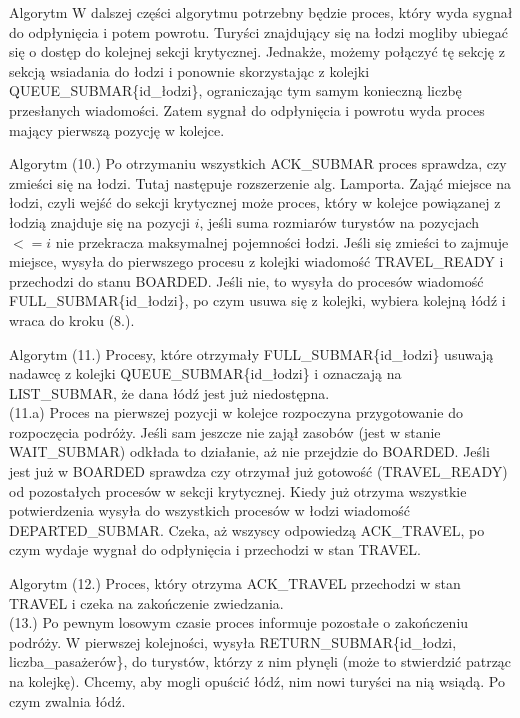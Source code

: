 \documentclass{beamer}
\begin{document}
\begin{frame}{Algorytm}
    \internallinenumbers
    W dalszej części algorytmu potrzebny będzie proces, który wyda sygnał do odpłynięcia i potem powrotu. Turyści znajdujący się na łodzi mogliby ubiegać się o dostęp do kolejnej sekcji krytycznej. Jednakże, możemy połączyć tę sekcję z sekcją wsiadania do łodzi i ponownie skorzystając z kolejki QUEUE\_SUBMAR\{id\_łodzi\}, ograniczając tym samym konieczną liczbę przesłanych wiadomości. Zatem sygnał do odpłynięcia i powrotu wyda proces mający pierwszą pozycję w kolejce.
\end{frame}

\begin{frame}{Algorytm}
    \internallinenumbers
    (10.) Po otrzymaniu wszystkich ACK\_SUBMAR proces sprawdza, czy zmieści się na łodzi. Tutaj następuje rozszerzenie alg. Lamporta. Zająć miejsce na łodzi, czyli wejść do sekcji krytycznej może proces, który w kolejce powiązanej z łodzią znajduje się na pozycji $i$, jeśli suma rozmiarów turystów na pozycjach $<= i$ nie przekracza maksymalnej pojemności łodzi. Jeśli się zmieści to zajmuje miejsce, wysyła do pierwszego procesu z kolejki wiadomość TRAVEL\_READY i przechodzi do stanu BOARDED. Jeśli nie, to wysyła do procesów wiadomość FULL\_SUBMAR\{id\_łodzi\}, po czym usuwa się z kolejki, wybiera kolejną łódź i wraca do kroku (8.).
\end{frame}

\begin{frame}{Algorytm}
    \internallinenumbers
    (11.) Procesy, które otrzymały FULL\_SUBMAR\{id\_łodzi\} usuwają nadawcę z kolejki QUEUE\_SUBMAR\{id\_łodzi\} i oznaczają na LIST\_SUBMAR, że dana łódź jest już niedostępna. \\

    (11.a) Proces na pierwszej pozycji w kolejce rozpoczyna przygotowanie do rozpoczęcia podróży. Jeśli sam jeszcze nie zajął zasobów (jest w stanie WAIT\_SUBMAR) odkłada to działanie, aż nie przejdzie do BOARDED. Jeśli jest już w BOARDED sprawdza czy otrzymał już gotowość (TRAVEL\_READY) od pozostałych procesów w sekcji krytycznej. Kiedy już otrzyma wszystkie potwierdzenia wysyła do wszystkich procesów w łodzi wiadomość DEPARTED\_SUBMAR. Czeka, aż wszyscy odpowiedzą ACK\_TRAVEL, po czym wydaje wygnał do odpłynięcia i przechodzi w stan TRAVEL.
\end{frame}

\begin{frame}{Algorytm}
    \internallinenumbers
    (12.) Proces, który otrzyma ACK\_TRAVEL przechodzi w stan TRAVEL i czeka na zakończenie zwiedzania. \\

    (13.) Po pewnym losowym czasie proces informuje pozostałe o zakończeniu podróży. W pierwszej kolejności, wysyła RETURN\_SUBMAR\{id\_łodzi, liczba\_pasażerów\}, do turystów, którzy z nim płynęli (może to stwierdzić patrząc na kolejkę). Chcemy, aby mogli opuścić łódź, nim nowi turyści na nią wsiądą. Po czym zwalnia łódź.
\end{frame}
\end{document}
